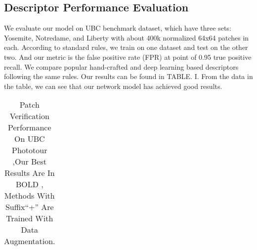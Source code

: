\documentclass[letterpaper, 10 pt, conference]{ieeeconf}  %
\begin{document}
\subsection{Descriptor Performance Evaluation}
We evaluate our model on UBC benchmark dataset, which have three sets: Yosemite, Notredame, and Liberty with about 400k normalized 64x64 patches in each. According to standard rules, we train on one dataset and test on the other two. And our metric is the false positive rate (FPR) at point of 0.95 true positive recall. We compare popular hand-crafted and deep learning based descriptors following the same rules. Our results can be found in TABLE. I. From the data in the table, we can see that our network model has achieved good results. 
\begin{table}[h]
\centering
\scriptsize
\caption{Patch Verification Performance On UBC Phototour ,Our Best Results Are In BOLD , Methods With Suffix“+” Are Trained With Data Augmentation.}
\label{table_example}
\begin{center}
\begin{tabular}{cccccccc}
\toprule


\end{tabular}
\end{center}
\end{table}
\end{document}
